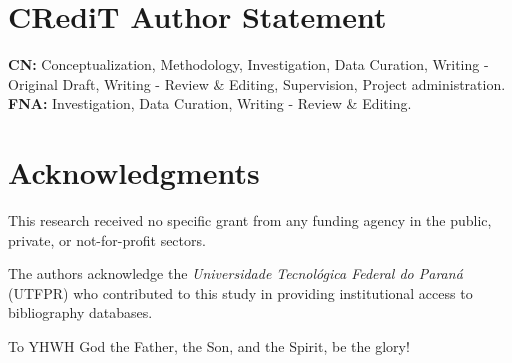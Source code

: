 
%



\section*{CRediT Author Statement}

    \textbf{CN:} Conceptualization, Methodology, Investigation, Data Curation, Writing - Original Draft,  Writing  -  Review  \&
    Editing, Supervision, Project administration. \textbf{FNA:} Investigation, Data Curation, Writing - Review \& Editing.



\section*{Acknowledgments}

    This research received no specific grant from any funding agency in the public, private, or not-for-profit sectors.

    The authors acknowledge the \textit{Universidade Tecnológica Federal do Paraná} (UTFPR) who contributed  to  this  study  in
    providing institutional access to bibliography databases.

    To YHWH God the Father, the Son, and the Spirit, be the glory!




